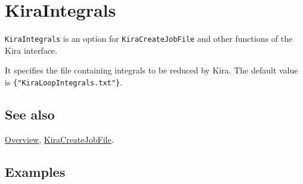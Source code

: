 \documentclass[../FeynHelpersManual.tex]{subfiles}
\begin{document}
\begin{Shaded}
\begin{Highlighting}[]
 
\end{Highlighting}
\end{Shaded}

\hypertarget{kiraintegrals}{
\section{KiraIntegrals}\label{kiraintegrals}}

\texttt{KiraIntegrals} is an option for \texttt{KiraCreateJobFile} and
other functions of the Kira interface.

It specifies the file containing integrals to be reduced by Kira. The
default value is \texttt{\{\allowbreak{}"KiraLoopIntegrals.txt"\}}.

\subsection{See also}

\hyperlink{toc}{Overview},
\hyperlink{kiracreatejobfile}{KiraCreateJobFile}.

\subsection{Examples}
\end{document}
